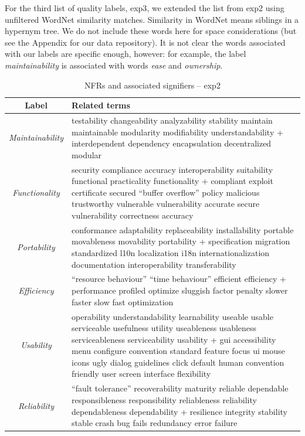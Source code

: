 \documentclass[]{sig-alternate}
\begin{document}
For the third list of quality labels,  \textsf{exp3}, we extended the list from \textsf{exp2} using unfiltered WordNet similarity matches. Similarity in WordNet means siblings in a hypernym tree. We do not include these words here for space considerations (but see the Appendix for our data repository). It is not clear the words associated with our labels are specific enough, however: for example, the label \emph{maintainability} is associated with words \emph{ease} and \emph{ownership}.

\begin{table}
	\centering
\begin{tabular}{c|p{9cm}}
\toprule
\textbf{Label} & \textbf{Related terms} \\
\midrule
\emph{Maintainability} &
testability changeability analyzability stability maintain maintainable modularity modifiability understandability + interdependent dependency encapsulation decentralized modular\\ \hline
\emph{Functionality} &
security compliance accuracy interoperability suitability functional practicality functionality + compliant exploit certificate secured “buffer overflow” policy malicious trustworthy vulnerable vulnerability accurate secure vulnerability correctness accuracy\\ \hline
\emph{Portability} &
conformance adaptability replaceability installability portable movableness movability portability + specification migration standardized l10n localization i18n internationalization documentation interoperability transferability\\ \hline
\emph{Efficiency} &
“resource behaviour” “time behaviour” efficient efficiency + performance profiled optimize sluggish factor penalty slower faster slow fast optimization\\ \hline
\emph{Usability} &
operability understandability learnability useable usable serviceable usefulness utility useableness usableness serviceableness serviceability usability + gui accessibility menu configure convention standard feature focus ui mouse icons ugly dialog guidelines click default human convention friendly user screen interface flexibility\\ \hline
\emph{Reliability} &
“fault tolerance” recoverability maturity reliable dependable responsibleness responsibility reliableness reliability dependableness dependability + resilience integrity stability stable crash bug fails redundancy error failure\\ 
\bottomrule
\end{tabular}
	\caption{NFRs and associated signifiers -- \textsf{exp2}}
	\label{tbl:wnsig}

\end{table}
\end{document}
